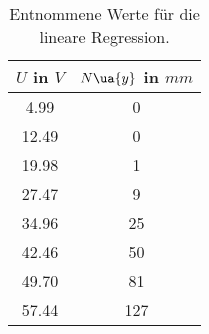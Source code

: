 \begin{table}
  \centering
  \caption{Entnommene Werte für die lineare Regression.}
  \label{tab:MessungC_Regression}
  \begin{tabular}{c c}
    \toprule
    $U$ in $\si{V}$ & $N\ua{y}$ in $\si{mm}$ \\
    \bottomrule
     4.99 & 0   \\
    12.49 & 0   \\
    19.98 & 1   \\
    27.47 & 9   \\
    34.96 & 25  \\
    42.46 & 50  \\
    49.70 & 81  \\
    57.44 & 127 \\
  \end{tabular}
\end{table}
